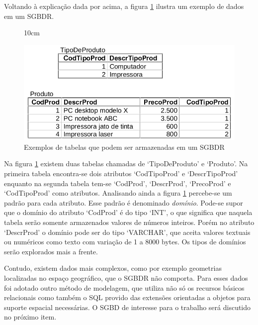 Voltando à explicação dada por \citeauthor{takai2005intro} acima, a figura \ref{tabelas_exe} ilustra um exemplo de dados em um SGBDR.  

\begin{figure}[!ht]{10cm}
  \caption{Exemplos de tabelas que podem ser armazenadas em um SGBDR} \label{tabelas_exe}
  \includegraphics[width=1\hsize]{figuras/tabelas_exemplo.png}
\end{figure}

Na figura \ref{tabelas_exe} existem duas tabelas chamadas de `TipoDeProduto' e `Produto'. Na primeira tabela encontra-se dois atributos `CodTipoProd' e `DescrTipoProd' enquanto na segunda tabela tem-se `CodProd', `DescrProd', `PrecoProd' e `CodTipoProd' como atributos. Analisando ainda a figura \ref{tabelas_exe} percebe-se um padrão para cada atributo. Esse padrão é denominado \textit{domínio}. Pode-se supor que o domínio do atributo `CodProd' é do tipo `INT', o que significa que naquela tabela serão somente armazenados valores de números inteiros. Porém no atributo `DescrProd' o domínio pode ser do tipo `VARCHAR', que aceita valores textuais ou numéricos como texto com variação de 1 a 8000 bytes. Os tipos de domínios serão explorados mais a frente.

Contudo, existem dados mais complexos, como por exemplo geometrias localizadas no espaço geográfico, que o SGBDR não comporta. Para esses dados foi adotado outro método de modelagem, que utiliza não só os recursos básicos relacionais como também o SQL provido das extensões orientadas a objetos para suporte espacial necessárias. O SGBD de interesse para o trabalho será discutido no próximo item.

